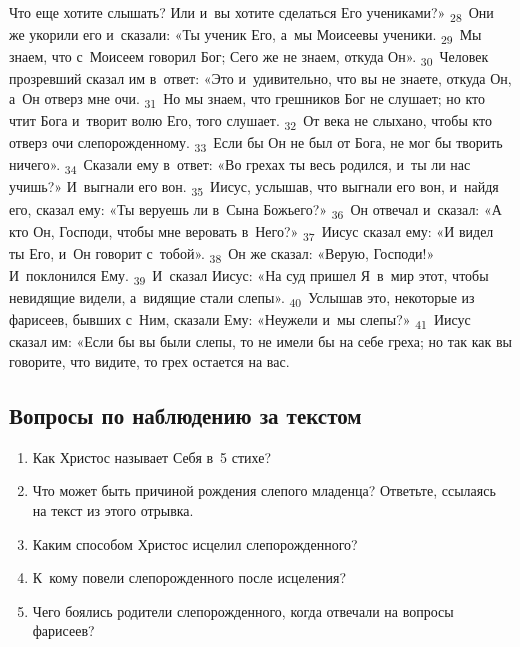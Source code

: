 \documentclass[a4paper,12pt]{article}
\begin{document}
Что еще хотите слышать? Или и~вы хотите сделаться Его учениками?» \textsubscript{28}~Они же укорили его и~сказали: «Ты ученик Его, а~мы Моисеевы ученики. \textsubscript{29}~Мы знаем, что с~Моисеем говорил Бог; Сего же не знаем, откуда Он». \textsubscript{30}~Человек прозревший сказал им в~ответ: «Это и~удивительно, что вы не знаете, откуда Он, а~Он отверз мне очи. \textsubscript{31}~Но мы знаем, что грешников Бог не слушает; но кто чтит Бога и~творит волю Его, того слушает. \textsubscript{32}~От века не слыхано, чтобы кто отверз очи слепорожденному. \textsubscript{33}~Если бы Он не был от Бога, не мог бы творить ничего». \textsubscript{34}~Сказали ему в~ответ: «Во грехах ты весь родился, и~ты ли нас учишь?» И~выгнали его вон. \textsubscript{35}~Иисус, услышав, что выгнали его вон, и~найдя его, сказал ему: «Ты веруешь ли в~Сына Божьего?» \textsubscript{36}~Он отвечал и~сказал: «А кто Он, Господи, чтобы мне веровать в~Него?» \textsubscript{37}~Иисус сказал ему: «И видел ты Его, и~Он говорит с~тобой». \textsubscript{38}~Он же сказал: «Верую, Господи!» И~поклонился Ему. \textsubscript{39}~И~сказал Иисус: «На суд пришел Я~в~мир этот, чтобы невидящие видели, а~видящие стали слепы». \textsubscript{40}~Услышав это, некоторые из фарисеев, бывших с~Ним, сказали Ему: «Неужели и~мы слепы?» \textsubscript{41}~Иисус сказал им: «Если бы вы были слепы, то не имели бы на себе греха; но так как вы говорите, что видите, то грех остается на вас. 

\subsection*{Вопросы по наблюдению за текстом}
\begin{enumerate}
    \item Как Христос называет Себя в~5 стихе? 
    
    \myline
    
    \item Что может быть причиной рождения слепого младенца? Ответьте, ссылаясь на текст из этого отрывка. 
    
    \myline
    
    \myline
    \item Каким способом Христос исцелил слепорожденного? 
    
    \myline
    
    \myline
    \item К~кому повели слепорожденного после исцеления? 
    
    \myline
    
    \myline
    \item Чего боялись родители слепорожденного, когда отвечали на вопросы фарисеев? 
    
    \myline
    
    \myline
\end{enumerate}
\end{document}
